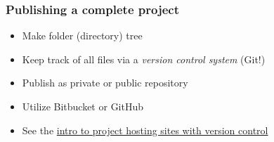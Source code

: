 \documentclass{beamer}
\begin{document}
\begin{frame}
\frametitle{Publishing a complete project}

\label{decay:exper:github}

\begin{itemize}
 \item Make folder (directory) tree

 \item Keep track of all files via a \emph{version control system} (Git!)

 \item Publish as private or public repository

 \item Utilize Bitbucket or GitHub

 \item See the \href{{http://hplgit.github.com/teamods/bitgit/html/}}{intro to project hosting sites with version control}
\end{itemize}

\noindent
\end{frame}
\end{document}
